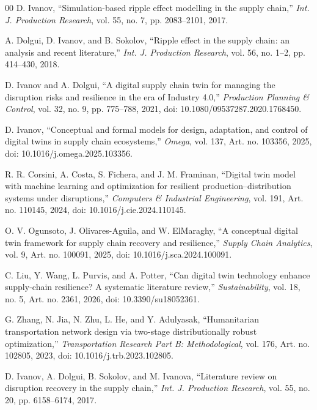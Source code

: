 \documentclass[conference]{IEEEtran}
\begin{document}
\begin{thebibliography}{00}
 D. Ivanov, ``Simulation-based ripple effect
modelling in the supply chain,'' \textit{Int. J. Production Research},
vol. 55, no. 7, pp. 2083--2101, 2017.

 A. Dolgui, D. Ivanov, and B. Sokolov,
``Ripple effect in the supply chain: an analysis and recent literature,''
\textit{Int. J. Production Research}, vol. 56, no. 1--2, pp. 414--430,
2018.

 D. Ivanov and A. Dolgui, ``A digital supply
chain twin for managing the disruption risks and resilience in the era of
Industry 4.0,'' \textit{Production Planning \& Control}, vol. 32, no. 9,
pp. 775--788, 2021, doi: 10.1080/09537287.2020.1768450.

 D. Ivanov, ``Conceptual and formal models for
design, adaptation, and control of digital twins in supply chain
ecosystems,'' \textit{Omega}, vol. 137, Art. no. 103356, 2025,
doi: 10.1016/j.omega.2025.103356.

 R. R. Corsini, A. Costa, S. Fichera, and
J. M. Framinan, ``Digital twin model with machine learning and optimization
for resilient production--distribution systems under disruptions,''
\textit{Computers \& Industrial Engineering}, vol. 191, Art. no. 110145,
2024, doi: 10.1016/j.cie.2024.110145.

 O. V. Ogunsoto, J. Olivares-Aguila, and
W. ElMaraghy, ``A conceptual digital twin framework for supply chain
recovery and resilience,'' \textit{Supply Chain Analytics}, vol. 9,
Art. no. 100091, 2025, doi: 10.1016/j.sca.2024.100091.

 C. Liu, Y. Wang, L. Purvis, and A. Potter, ``Can digital
twin technology enhance supply-chain resilience? A systematic literature
review,'' \textit{Sustainability}, vol. 18, no. 5, Art. no. 2361, 2026,
doi: 10.3390/su18052361.

 G. Zhang, N. Jia, N. Zhu, L. He, and Y. Adulyasak,
``Humanitarian transportation network design via two-stage distributionally
robust optimization,'' \textit{Transportation Research Part B:
Methodological}, vol. 176, Art. no. 102805, 2023,
doi: 10.1016/j.trb.2023.102805.

 D. Ivanov, A. Dolgui, B. Sokolov, and
M. Ivanova, ``Literature review on disruption recovery in the supply
chain,'' \textit{Int. J. Production Research}, vol. 55, no. 20,
pp. 6158--6174, 2017.


\end{thebibliography}
\end{document}
